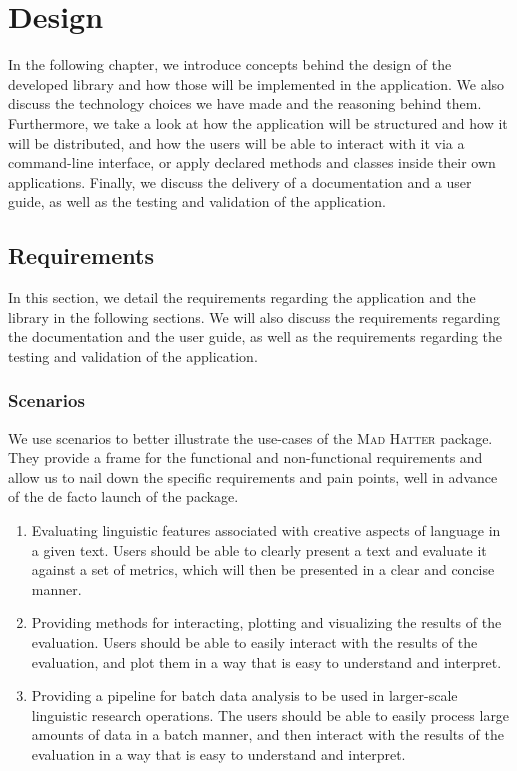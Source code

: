 \chapter{Design}
\label{chap:design}

In the following chapter, we introduce concepts behind the design of the developed library and how those will be implemented in the application. We also discuss the technology choices we have made and the reasoning behind them. Furthermore, we take a look at how the application will be structured and how it will be distributed, and how the users will be able to interact with it via a command-line interface, or apply declared methods and classes inside their own applications. Finally, we discuss the delivery of a documentation and a user guide, as well as the testing and validation of the application.

\section{Requirements}
In this section, we detail the requirements regarding the application and the library in the following sections. We will also discuss the requirements regarding the documentation and the user guide, as well as the requirements regarding the testing and validation of the application.

\subsection{Scenarios}
We use scenarios to better illustrate the use-cases of the \textsc{Mad Hatter} package. They provide a frame for the functional and non-functional requirements and allow us to nail down the specific requirements and pain points, well in advance of the de facto launch of the package.

\begin{enumerate}
    \item Evaluating linguistic features associated with creative aspects of language in a given text. Users should be able to clearly present a text and evaluate it against a set of metrics, which will then be presented in a clear and concise manner.
    \item Providing methods for interacting, plotting and visualizing the results of the evaluation. Users should be able to easily interact with the results of the evaluation, and plot them in a way that is easy to understand and interpret.
    \item Providing a pipeline for batch data analysis to be used in larger-scale linguistic research operations. The users should be able to easily process large amounts of data in a batch manner, and then interact with the results of the evaluation in a way that is easy to understand and interpret.
\end{enumerate}

